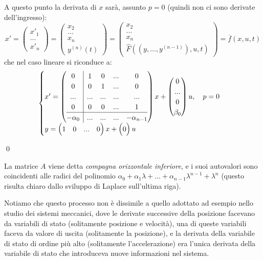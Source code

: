 \documentclass[a4paper,11pt]{article}
\begin{document}
A questo punto la derivata di $x$ sarà, assunto $p = 0$ (quindi non ci sono derivate dell'ingresso): 
$$
x' = \begin{pmatrix}
x'_1 \\
... \\
x'_n
\end{pmatrix} = \begin{pmatrix}
x_2 \\
... \\
x_n \\ 
y^{(n)}(t)
\end{pmatrix}
= \begin{pmatrix}
x_2 \\
... \\
x_n \\
\hat{F} \left( (y, ..., y^{(n - 1)}), u, t \right)
\end{pmatrix}
= \overline{f}(x, u, t)
$$
che nel caso lineare si riconduce a:
\[
	\begin{cases}	
x' = \left(\begin{array}{@{}c | cccc@{}}
	0 & 1 & 0 & ... & 0 \\
	0 & 0 & 1 & ... & 0 \\
	... & ... & ... & ... & ... \\
	0 & 0 & 0 & ... & 1 \\
	\hline
	-\alpha_0 & ... & ... & ... & -\alpha_{n - 1}
\end{array}\right)
x + \begin{pmatrix}
0 \\
... \\
0 \\
\beta_0
\end{pmatrix} u, \quad p = 0 \\ 
y = \begin{pmatrix}
	1 & 0 & ... & 0
\end{pmatrix} x + \begin{pmatrix}
0
\end{pmatrix} u
	\end{cases}
\]

\qed

La matrice $A$ viene detta \textit{compagna orizzontale inferiore}, e i suoi autovalori sono coincidenti alle radici del polinomio $\alpha_0 + \alpha_1 \lambda + ... + \alpha_{n - 1} \lambda^{n - 1} + \lambda^n$ (questo risulta chiaro dallo sviluppo di Laplace sull'ultima riga).

\par\smallskip

Notiamo che questo processo non è dissimile a quello adottato ad esempio nello studio dei sistemi meccanici, dove le derivate successive della posizione facevano da variabili di stato (solitamente posizione e velocità), una di queste variabili faceva da valore di uscita (solitamente la posizione), e la derivata della variabile di stato di ordine più alto (solitamente l'accelerazione) era l'unica derivata della variabile di stato che introduceva nuove informazioni nel sistema.
\end{document}
